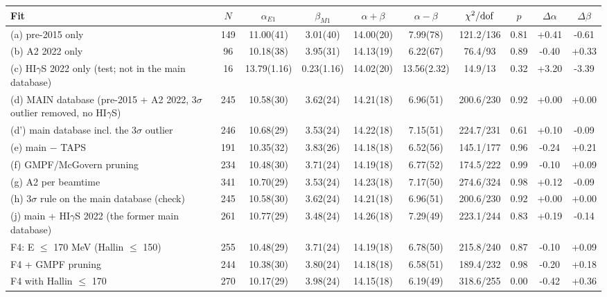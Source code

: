 \begin{tabular}{lccccccccc}
\hline
Fit & $N$ & $\alpha_{E1}$ & $\beta_{M1}$ & $\alpha+\beta$ & $\alpha-\beta$ & $\chi^2/{\rm dof}$ & $p$ & $\Delta\alpha$ & $\Delta\beta$ \\
\hline
(a) pre-2015 only & 149 & 11.00(41) & 3.01(40) & 14.00(20) & 7.99(78) & 121.2/136 & 0.81 & +0.41 & -0.61 \\
(b) A2 2022 only & 96 & 10.18(38) & 3.95(31) & 14.13(19) & 6.22(67) & 76.4/93 & 0.89 & -0.40 & +0.33 \\
(c) HI$\gamma$S 2022 only (test; not in the main database) & 16 & 13.79(1.16) & 0.23(1.16) & 14.02(20) & 13.56(2.32) & 14.9/13 & 0.32 & +3.20 & -3.39 \\
(d) MAIN database (pre-2015 + A2 2022, 3$\sigma$ outlier removed, no HI$\gamma$S) & 245 & 10.58(30) & 3.62(24) & 14.21(18) & 6.96(51) & 200.6/230 & 0.92 & +0.00 & +0.00 \\
(d') main database incl. the 3$\sigma$ outlier & 246 & 10.68(29) & 3.53(24) & 14.22(18) & 7.15(51) & 224.7/231 & 0.61 & +0.10 & -0.09 \\
(e) main $-$ TAPS & 191 & 10.35(32) & 3.83(26) & 14.18(18) & 6.52(56) & 145.1/177 & 0.96 & -0.24 & +0.21 \\
(f) GMPF/McGovern pruning & 234 & 10.48(30) & 3.71(24) & 14.19(18) & 6.77(52) & 174.5/222 & 0.99 & -0.10 & +0.09 \\
(g) A2 per beamtime & 341 & 10.70(29) & 3.53(24) & 14.23(18) & 7.17(50) & 274.6/324 & 0.98 & +0.12 & -0.09 \\
(h) 3$\sigma$ rule on the main database (check) & 245 & 10.58(30) & 3.62(24) & 14.21(18) & 6.96(51) & 200.6/230 & 0.92 & +0.00 & +0.00 \\
(j) main + HI$\gamma$S 2022 (the former main database) & 261 & 10.77(29) & 3.48(24) & 14.26(18) & 7.29(49) & 223.1/244 & 0.83 & +0.19 & -0.14 \\
F4: E $\le$ 170 MeV (Hallin $\le$ 150) & 255 & 10.48(29) & 3.71(24) & 14.19(18) & 6.78(50) & 215.8/240 & 0.87 & -0.10 & +0.09 \\
F4 + GMPF pruning & 244 & 10.38(30) & 3.80(24) & 14.18(18) & 6.58(51) & 189.4/232 & 0.98 & -0.20 & +0.18 \\
F4 with Hallin $\le$ 170 & 270 & 10.17(29) & 3.98(24) & 14.15(18) & 6.19(49) & 318.6/255 & 0.00 & -0.42 & +0.36 \\
\hline
\end{tabular}


